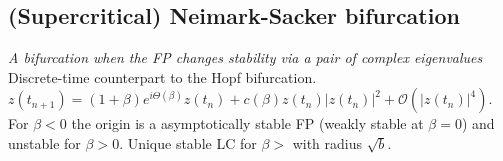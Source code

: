 \subsection{(Supercritical) Neimark-Sacker bifurcation}
\emph{A bifurcation when the FP changes stability via a pair of complex eigenvalues}
Discrete-time counterpart to the Hopf bifurcation.\\
$z(t_{n+1}) = (1+\beta)e^{i\Theta(\beta)}z(t_n)+c(\beta)z(t_n)|z(t_n)|^2 + \mathcal{O}(|z(t_n)|^4)$. For $\beta<0$ the origin is a asymptotically stable FP (weakly stable at $\beta=0$) and unstable for $\beta>0$. Unique stable LC for $\beta>$ with radius $\sqrt{b}$.
